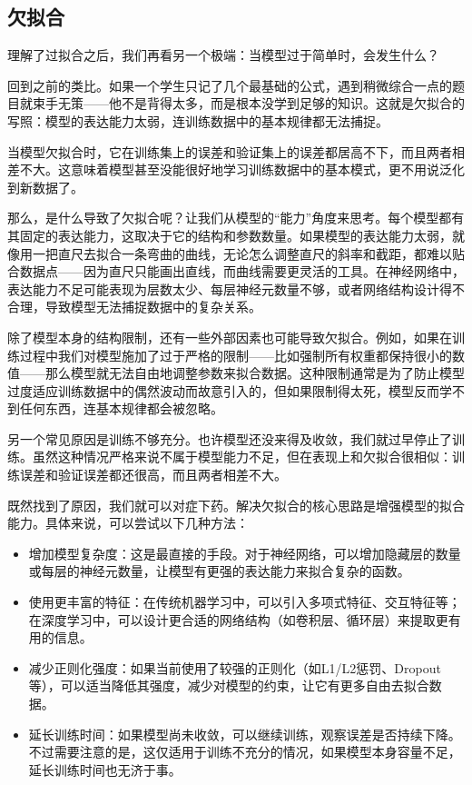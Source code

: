 \documentclass[lang=cn,zihao=-4,a4paper,fontset=windows]{beautybook}
\begin{document}
\subsection{欠拟合}

理解了过拟合之后，我们再看另一个极端：当模型过于简单时，会发生什么？

回到之前的类比。如果一个学生只记了几个最基础的公式，遇到稍微综合一点的题目就束手无策——他不是背得太多，而是根本没学到足够的知识。这就是欠拟合的写照：模型的表达能力太弱，连训练数据中的基本规律都无法捕捉。

当模型欠拟合时，它在训练集上的误差和验证集上的误差都居高不下，而且两者相差不大。这意味着模型甚至没能很好地学习训练数据中的基本模式，更不用说泛化到新数据了。

那么，是什么导致了欠拟合呢？让我们从模型的“能力”角度来思考。每个模型都有其固定的表达能力，这取决于它的结构和参数数量。如果模型的表达能力太弱，就像用一把直尺去拟合一条弯曲的曲线，无论怎么调整直尺的斜率和截距，都难以贴合数据点——因为直尺只能画出直线，而曲线需要更灵活的工具。在神经网络中，表达能力不足可能表现为层数太少、每层神经元数量不够，或者网络结构设计得不合理，导致模型无法捕捉数据中的复杂关系。

除了模型本身的结构限制，还有一些外部因素也可能导致欠拟合。例如，如果在训练过程中我们对模型施加了过于严格的限制——比如强制所有权重都保持很小的数值——那么模型就无法自由地调整参数来拟合数据。这种限制通常是为了防止模型过度适应训练数据中的偶然波动而故意引入的，但如果限制得太死，模型反而学不到任何东西，连基本规律都会被忽略。

另一个常见原因是训练不够充分。也许模型还没来得及收敛，我们就过早停止了训练。虽然这种情况严格来说不属于模型能力不足，但在表现上和欠拟合很相似：训练误差和验证误差都还很高，而且两者相差不大。

既然找到了原因，我们就可以对症下药。解决欠拟合的核心思路是增强模型的拟合能力。具体来说，可以尝试以下几种方法：
\begin{itemize}
\item 增加模型复杂度：这是最直接的手段。对于神经网络，可以增加隐藏层的数量或每层的神经元数量，让模型有更强的表达能力来拟合复杂的函数。
\item 使用更丰富的特征：在传统机器学习中，可以引入多项式特征、交互特征等；在深度学习中，可以设计更合适的网络结构（如卷积层、循环层）来提取更有用的信息。
\item 减少正则化强度：如果当前使用了较强的正则化（如L1/L2惩罚、Dropout等），可以适当降低其强度，减少对模型的约束，让它有更多自由去拟合数据。
\item 延长训练时间：如果模型尚未收敛，可以继续训练，观察误差是否持续下降。不过需要注意的是，这仅适用于训练不充分的情况，如果模型本身容量不足，延长训练时间也无济于事。
\end{itemize}
\end{document}
